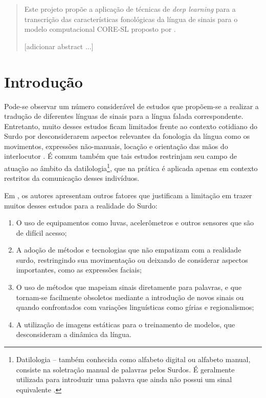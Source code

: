 

\maketitle
\begin{abstract}
Este projeto propõe a aplicação de técnicas de \textit{deep learning} para a transcrição das características fonológicas da língua de sinais para o modelo computacional CORE-SL proposto por \cite{antunes-2015}. 

[adicionar abstract ...]
\end{abstract}


\section{Introdução}
\label{sec:introducao}
Pode-se observar um número considerável de estudos que propõem-se a realizar a tradução de diferentes línguas de sinais para a língua falada correspondente. Entretanto, muito desses estudos ficam limitados frente ao contexto cotidiano do Surdo por desconsiderarem aspectos relevantes da fonologia da língua como os movimentos, expressões não-manuais, locação e orientação das mãos do interlocutor \cite{quadros-2004}. É comum também que tais estudos restrinjam seu campo de atuação ao âmbito da datilologia\footnote{
Datilologia – também conhecida como alfabeto digital ou alfabeto manual, consiste na soletração manual de palavras pelos Surdos. É geralmente utilizada para introduzir uma palavra que ainda não possui um sinal equivalente \cite{quadros-2004}\cite{pereira-choi-2011}.
}, que na prática é aplicada apenas em contexto restritos da comunicação desses indivíduos.

Em \cite{antunes-hcisl-2011}, os autores apresentam outros fatores que justificam a limitação em trazer muitos desses estudos para a realidade do Surdo: 
\begin{enumerate}
    \item O uso de equipamentos como luvas, acelerômetros e outros sensores que são de difícil acesso; 
    \item A adoção de métodos e tecnologias que não empatizam com a realidade surdo, restringindo sua movimentação ou deixando de considerar aspectos importantes, como as expressões faciais;
    \item O uso de métodos que mapeiam sinais diretamente para palavras, e que tornam-se facilmente obsoletos mediante a introdução de novos sinais ou quando confrontados com variações linguísticas como gírias e regionalismos; 
    \item A utilização de imagens estáticas para o treinamento de modelos, que desconsideram a dinâmica da língua.
\end{enumerate}

